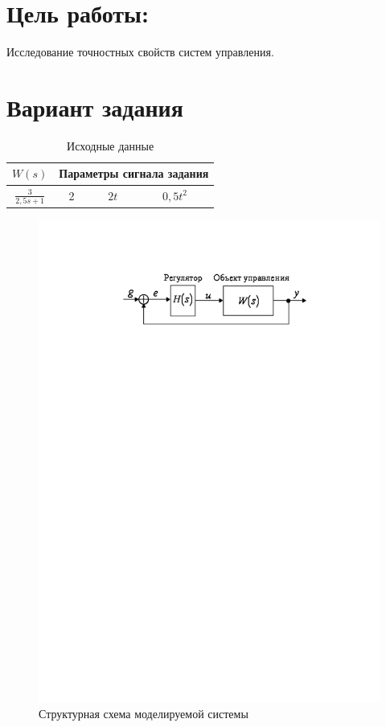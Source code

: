 \documentclass[a4paper, 11pt, russian]{article}
\begin{document}
    

    \section*{Цель работы:}
    Исследование точностных свойств систем управления.
    \section*{Вариант задания}
    \begin{table}[ht!]
        \flushleft
        \caption{Исходные данные}
        \begin{tabular}{c|c|c|c}
            $W(s)$ & \multicolumn{3}{c}{Параметры сигнала задания} \\
            \hline
            $\displaystyle{\frac{3}{2,5s + 1}}$ & 2 & $2t$ & $0,5t^2$
        \end{tabular}
    \end{table}

    \begin{figure}[h!]
        \centering
        \includegraphics{0ast}
        \caption{Структурная схема моделируемой системы}
    \end{figure}
\end{document}
